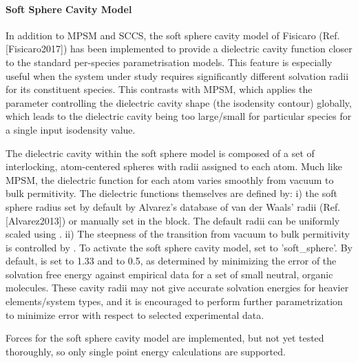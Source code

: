 \documentclass[letterpaper,10pt,english]{sphinxmanual}
\begin{document}
\paragraph{Soft Sphere Cavity Model}
\label{\detokenize{implicit_solvation_v3:soft-sphere-cavity-model}}
In addition to MPSM and SCCS, the soft sphere cavity model of Fisicaro
 (Ref. {[}Fisicaro2017{]}) has been implemented to provide a dielectric cavity
function closer to the standard per-species parametrisation models. This
feature is especially useful when the system under study requires
significantly different solvation radii for its constituent species.
This contrasts with MPSM, which applies the parameter controlling the
dielectric cavity shape (the isodensity contour) globally, which leads
to the dielectric cavity being too large/small for particular species
for a single input isodensity value.

The dielectric cavity within the soft sphere model is composed of a set
of interlocking, atom-centered spheres with radii assigned to each atom.
Much like MPSM, the dielectric function for each atom varies smoothly
from vacuum to bulk permitivity. The dielectric functions themselves are
defined by: i) the soft sphere radius set by default by Alvarez’s
database of van der Waals’ radii (Ref. {[}Alvarez2013{]}) or manually set in the
 block. The default radii can be uniformly
scaled using . ii) The steepness of the
transition from vacuum to bulk permitivity is controlled by
. To activate the soft sphere cavity model, set
 to ’soft\_sphere’. By default,
 is set to 1.33 and  to
0.5, as determined by minimizing the error of the solvation free energy
against empirical data for a set of small neutral, organic molecules.
These cavity radii may not give accurate solvation energies for heavier
elements/system types, and it is encouraged to perform further
parametrization to minimize error with respect to selected experimental
data.

Forces for the soft sphere cavity model are implemented, but not yet
tested thoroughly, so only single point energy calculations are
supported.
\end{document}
